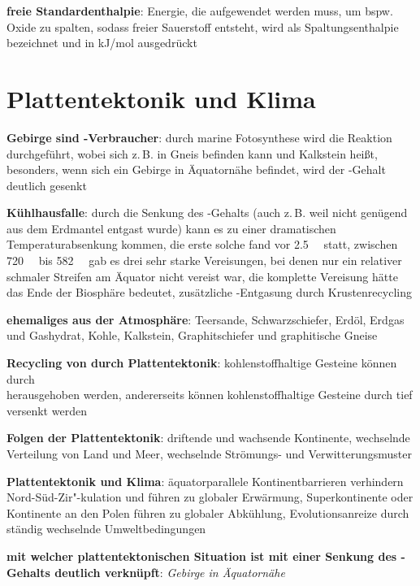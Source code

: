 \textbf{freie Standardenthalpie}:
Energie, die aufgewendet werden muss, um bspw. Oxide zu spalten, sodass freier Sauerstoff entsteht,
wird als Spaltungsenthalpie bezeichnet und in \si{\kilo\joule/\mol} ausgedrückt

\pagebreak

\section{%
    Plattentektonik und Klima%
}

\textbf{Gebirge sind -Verbraucher}:
durch marine Fotosynthese wird die Reaktion
 durchgeführt,
wobei sich  z.\,B. in Gneis befinden kann und  Kalkstein heißt,
besonders, wenn sich ein Gebirge in Äquatornähe befindet, wird der -Gehalt deutlich gesenkt

\textbf{Kühlhausfalle}:
durch die Senkung des -Gehalts
(auch z.\,B. weil nicht genügend  aus dem Erdmantel entgast wurde)
kann es zu einer dramatischen Temperaturabsenkung kommen,
die erste solche fand vor \SI{2.5}{\mega\year} statt,
zwischen \SI{720}{\mega\year} bis \SI{582}{\mega\year} gab es drei sehr starke Vereisungen,
bei denen nur ein relativer schmaler Streifen am Äquator nicht vereist war,
die komplette Vereisung hätte das Ende der Biosphäre bedeutet,
zusätzliche -Entgasung durch Krustenrecycling

\textbf{ehemaliges  aus der Atmosphäre}:
Teersande,
Schwarzschiefer,
Erdöl,
Erdgas und Gashydrat,
Kohle,
Kalkstein,
Graphitschiefer und graphitische Gneise

\textbf{Recycling von  durch Plattentektonik}:
kohlenstoffhaltige Gesteine können durch\\
herausgehoben werden,
andererseits können kohlenstoffhaltige Gesteine durch
tief versenkt werden

\textbf{Folgen der Plattentektonik}:
driftende und wachsende Kontinente,
wechselnde Verteilung von Land und Meer,
wechselnde Strömungs- und Verwitterungsmuster

\textbf{Plattentektonik und Klima}:
äquatorparallele Kontinentbarrieren verhindern Nord-Süd-Zir"-kulation und führen zu
globaler Erwärmung,
Superkontinente oder Kontinente an den Polen führen zu globaler Abkühlung,
Evolutionsanreize durch ständig wechselnde Umweltbedingungen

\begin{wichtig}
    \item
    \textbf{mit welcher plattentektonischen Situation ist mit einer Senkung des -Gehalts
    deutlich verknüpft}:
    \emph{Gebirge in Äquatornähe}
\end{wichtig}

